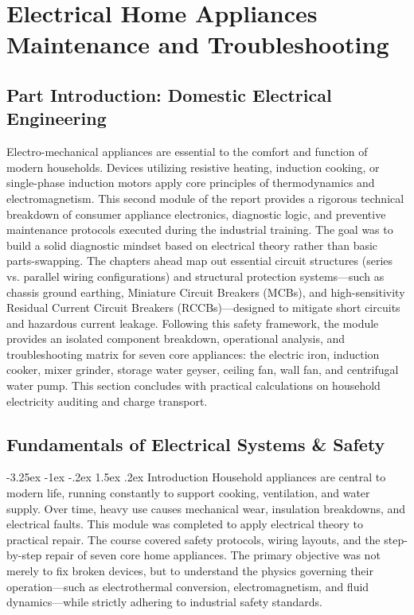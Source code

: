 \documentclass[11pt,a4paper]{report}
\makeatletter
\renewcommand{\section}{\@startsection{section}{1}{\z@}%
  {-3.25ex \@plus -1ex \@minus -.2ex}%
  {1.5ex \@plus.2ex}%
  {\normalfont\Large\bfseries\color{primaryColor}}}
\makeatother
\begin{document}
\part{Electrical Home Appliances Maintenance and Troubleshooting}
\chapter*{Part Introduction: Domestic Electrical Engineering}
Electro-mechanical appliances are essential to the comfort and function of modern households. Devices utilizing resistive heating, induction cooking, or single-phase induction motors apply core principles of thermodynamics and electromagnetism. This second module of the report provides a rigorous technical breakdown of consumer appliance electronics, diagnostic logic, and preventive maintenance protocols executed during the industrial training. The goal was to build a solid diagnostic mindset based on electrical theory rather than basic parts-swapping. The chapters ahead map out essential circuit structures (series vs. parallel wiring configurations) and structural protection systems—such as chassis ground earthing, Miniature Circuit Breakers (MCBs), and high-sensitivity Residual Current Circuit Breakers (RCCBs)—designed to mitigate short circuits and hazardous current leakage. Following this safety framework, the module provides an isolated component breakdown, operational analysis, and troubleshooting matrix for seven core appliances: the electric iron, induction cooker, mixer grinder, storage water geyser, ceiling fan, wall fan, and centrifugal water pump. This section concludes with practical calculations on household electricity auditing and charge transport.
\chapter{Fundamentals of Electrical Systems \& Safety}
\section{Introduction}
Household appliances are central to modern life, running constantly to support cooking, ventilation, and water supply. Over time, heavy use causes mechanical wear, insulation breakdowns, and electrical faults. This module was completed to apply electrical theory to practical repair. The course covered safety protocols, wiring layouts, and the step-by-step repair of seven core home appliances. The primary objective was not merely to fix broken devices, but to understand the physics governing their operation—such as electrothermal conversion, electromagnetism, and fluid dynamics—while strictly adhering to industrial safety standards.
\end{document}
